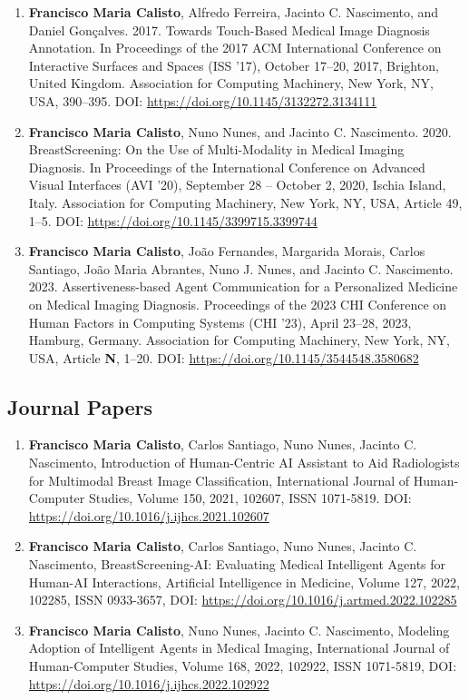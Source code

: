 \begin{enumerate}
\item {\bf Francisco Maria Calisto}, Alfredo Ferreira, Jacinto C. Nascimento, and Daniel Gonçalves. 2017. Towards Touch-Based Medical Image Diagnosis Annotation. In Proceedings of the 2017 ACM International Conference on Interactive Surfaces and Spaces (ISS '17), October 17--20, 2017, Brighton, United Kingdom. Association for Computing Machinery, New York, NY, USA, 390–395. DOI: \href{https://doi.org/10.1145/3132272.3134111}{https://doi.org/10.1145/3132272.3134111}
\item {\bf Francisco Maria Calisto}, Nuno Nunes, and Jacinto C. Nascimento. 2020. BreastScreening: On the Use of Multi-Modality in Medical Imaging Diagnosis. In Proceedings of the International Conference on Advanced Visual Interfaces (AVI '20), September 28 -- October 2, 2020, Ischia Island, Italy. Association for Computing Machinery, New York, NY, USA, Article 49, 1–5. DOI: \href{https://doi.org/10.1145/3399715.3399744}{https://doi.org/10.1145/3399715.3399744}
\item {\bf Francisco Maria Calisto}, Jo\~{a}o Fernandes, Margarida Morais, Carlos Santiago, Jo\~{a}o Maria Abrantes, Nuno J. Nunes, and Jacinto C. Nascimento. 2023. Assertiveness-based Agent Communication for a Personalized Medicine on Medical Imaging Diagnosis. Proceedings of the 2023 CHI Conference on Human Factors in Computing Systems (CHI '23), April 23--28, 2023, Hamburg, Germany. Association for Computing Machinery, New York, NY, USA, Article {\bf N}, 1–20. DOI: \href{https://doi.org/10.1145/3544548.3580682}{https://doi.org/10.1145/3544548.3580682}
\end{enumerate}

\subsection{Journal Papers}
\label{sec:sec00100602}

\begin{enumerate}
\item {\bf Francisco Maria Calisto}, Carlos Santiago, Nuno Nunes, Jacinto C. Nascimento, Introduction of Human-Centric AI Assistant to Aid Radiologists for Multimodal Breast Image Classification, International Journal of Human-Computer Studies, Volume 150, 2021, 102607, ISSN 1071-5819. DOI: \href{https://doi.org/10.1016/j.ijhcs.2021.102607}{https://doi.org/10.1016/j.ijhcs.2021.102607}
\item {\bf Francisco Maria Calisto}, Carlos Santiago, Nuno Nunes, Jacinto C. Nascimento, BreastScreening-AI: Evaluating Medical Intelligent Agents for Human-AI Interactions, Artificial Intelligence in Medicine, Volume 127, 2022, 102285, ISSN 0933-3657, DOI: \href{https://doi.org/10.1016/j.artmed.2022.102285}{https://doi.org/10.1016/j.artmed.2022.102285}
\item {\bf Francisco Maria Calisto}, Nuno Nunes, Jacinto C. Nascimento, Modeling Adoption of Intelligent Agents in Medical Imaging, International Journal of Human-Computer Studies, Volume 168, 2022, 102922, ISSN 1071-5819, DOI: \href{https://doi.org/10.1016/j.ijhcs.2022.102922}{https://doi.org/10.1016/j.ijhcs.2022.102922}
\end{enumerate}

